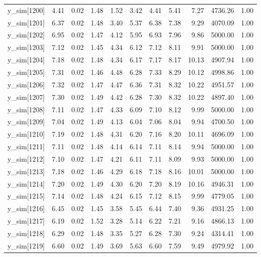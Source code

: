 \begin{table}[ht]
\begin{tabular}{rrrrrrrrrrr}
  y\_sim[1200] & 4.41 & 0.02 & 1.48 & 1.52 & 3.42 & 4.41 & 5.41 & 7.27 & 4736.26 & 1.00 \\ 
  y\_sim[1201] & 6.37 & 0.02 & 1.48 & 3.40 & 5.37 & 6.38 & 7.38 & 9.29 & 4070.09 & 1.00 \\ 
  y\_sim[1202] & 6.95 & 0.02 & 1.47 & 4.12 & 5.95 & 6.93 & 7.96 & 9.86 & 5000.00 & 1.00 \\ 
  y\_sim[1203] & 7.12 & 0.02 & 1.45 & 4.34 & 6.12 & 7.12 & 8.11 & 9.91 & 5000.00 & 1.00 \\ 
  y\_sim[1204] & 7.18 & 0.02 & 1.48 & 4.34 & 6.17 & 7.17 & 8.17 & 10.13 & 4907.94 & 1.00 \\ 
  y\_sim[1205] & 7.31 & 0.02 & 1.46 & 4.48 & 6.28 & 7.33 & 8.29 & 10.12 & 4998.86 & 1.00 \\ 
  y\_sim[1206] & 7.32 & 0.02 & 1.47 & 4.47 & 6.36 & 7.31 & 8.32 & 10.22 & 4951.57 & 1.00 \\ 
  y\_sim[1207] & 7.30 & 0.02 & 1.49 & 4.42 & 6.28 & 7.30 & 8.32 & 10.22 & 4897.40 & 1.00 \\ 
  y\_sim[1208] & 7.11 & 0.02 & 1.47 & 4.33 & 6.09 & 7.10 & 8.12 & 9.99 & 5000.00 & 1.00 \\ 
  y\_sim[1209] & 7.04 & 0.02 & 1.49 & 4.13 & 6.04 & 7.06 & 8.04 & 9.94 & 4700.50 & 1.00 \\ 
  y\_sim[1210] & 7.19 & 0.02 & 1.48 & 4.31 & 6.20 & 7.16 & 8.20 & 10.11 & 4696.09 & 1.00 \\ 
  y\_sim[1211] & 7.11 & 0.02 & 1.48 & 4.14 & 6.14 & 7.11 & 8.14 & 9.94 & 5000.00 & 1.00 \\ 
  y\_sim[1212] & 7.10 & 0.02 & 1.47 & 4.21 & 6.11 & 7.11 & 8.09 & 9.93 & 5000.00 & 1.00 \\ 
  y\_sim[1213] & 7.18 & 0.02 & 1.46 & 4.29 & 6.18 & 7.18 & 8.16 & 10.01 & 5000.00 & 1.00 \\ 
  y\_sim[1214] & 7.20 & 0.02 & 1.49 & 4.30 & 6.20 & 7.20 & 8.19 & 10.16 & 4946.31 & 1.00 \\ 
  y\_sim[1215] & 7.14 & 0.02 & 1.48 & 4.24 & 6.15 & 7.12 & 8.15 & 9.99 & 4779.05 & 1.00 \\ 
  y\_sim[1216] & 6.45 & 0.02 & 1.45 & 3.58 & 5.45 & 6.44 & 7.40 & 9.36 & 4931.25 & 1.00 \\ 
  y\_sim[1217] & 6.19 & 0.02 & 1.52 & 3.28 & 5.14 & 6.22 & 7.21 & 9.16 & 4866.13 & 1.00 \\ 
  y\_sim[1218] & 6.29 & 0.02 & 1.48 & 3.35 & 5.27 & 6.28 & 7.30 & 9.24 & 4314.41 & 1.00 \\ 
  y\_sim[1219] & 6.60 & 0.02 & 1.49 & 3.69 & 5.63 & 6.60 & 7.59 & 9.49 & 4979.92 & 1.00 \\ 

\end{tabular}
\end{table}
